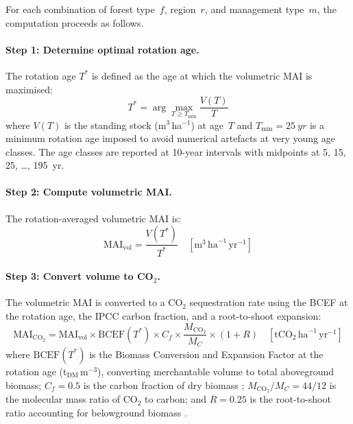 \documentclass[12pt, a4paper]{article}
\begin{document}
For each combination of forest type~$f$, region~$r$, and management type~$m$,
the computation proceeds as follows.

\paragraph{Step 1: Determine optimal rotation age.}
The rotation age $T^*$ is defined as the age at which the volumetric MAI is
maximised:
\begin{equation}
    T^* = \arg\max_{T \geq T_\text{min}} \frac{V(T)}{T}
    \label{eq:rotation_age}
\end{equation}
where $V(T)$ is the standing stock (m$^3$\,ha$^{-1}$) at age~$T$ and
$T_\text{min} = \SI{25}{yr}$ is a minimum rotation age imposed to avoid
numerical artefacts at very young age classes. The age classes are reported
at 10-year intervals with midpoints at 5, 15, 25, \ldots, \SI{195}{yr}.

\paragraph{Step 2: Compute volumetric MAI.}
The rotation-averaged volumetric MAI is:
\begin{equation}
    \text{MAI}_\text{vol} = \frac{V(T^*)}{T^*}
    \quad [\text{m}^3\,\text{ha}^{-1}\,\text{yr}^{-1}]
    \label{eq:mai_vol}
\end{equation}

\paragraph{Step 3: Convert volume to CO$_2$.}
The volumetric MAI is converted to a CO$_2$ sequestration rate using the BCEF
at the rotation age, the IPCC carbon fraction, and a root-to-shoot expansion:
\begin{equation}
    \text{MAI}_{\text{CO}_2} = \text{MAI}_\text{vol}
        \times \text{BCEF}(T^*)
        \times C_f
        \times \frac{M_{\text{CO}_2}}{M_C}
        \times (1 + R)
    \quad [\text{tCO}_2\,\text{ha}^{-1}\,\text{yr}^{-1}]
    \label{eq:mai_co2}
\end{equation}
where $\text{BCEF}(T^*)$ is the Biomass Conversion and Expansion Factor at
the rotation age (t$_\text{DM}$\,m$^{-3}$), converting merchantable volume
to total aboveground biomass; $C_f = 0.5$ is the carbon fraction of dry
biomass \citep{IPCC2006}; $M_{\text{CO}_2}/M_C = 44/12$ is
the molecular mass ratio of CO$_2$ to carbon; and $R = 0.25$ is the
root-to-shoot ratio accounting for belowground biomass
\citep{IPCC2006, Mokany2006}.
\end{document}
